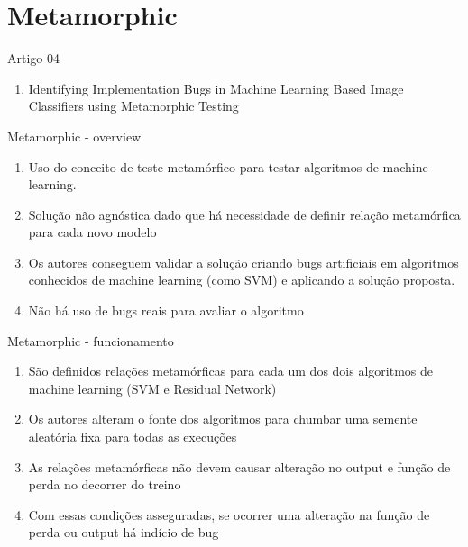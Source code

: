 \section{Metamorphic}

\begin{frame}
	\begin{block}{Artigo 04}
	\begin{enumerate}
		\item Identifying Implementation Bugs in Machine Learning Based Image Classifiers using Metamorphic Testing \cite{Metamorphic}
	\end{enumerate}
	\end{block}
\end{frame}

\begin{frame}
	\begin{block}{Metamorphic - overview}
	\begin{enumerate}
		\item Uso do conceito de teste metamórfico para testar algoritmos de machine learning.
		\item Solução não agnóstica dado que há necessidade de definir relação metamórfica para cada novo modelo
		\item Os autores conseguem validar a solução criando bugs artificiais em algoritmos conhecidos de machine learning (como SVM) e aplicando a solução proposta.
		\item Não há uso de bugs reais para avaliar o algoritmo
	\end{enumerate}
	\end{block}
\end{frame}

\begin{frame}
	\begin{block}{Metamorphic - funcionamento}
		\begin{enumerate}
			\item São definidos relações metamórficas para cada um dos dois algoritmos de machine learning (SVM e Residual Network)
			\item Os autores alteram o fonte dos algoritmos para chumbar uma semente aleatória fixa para todas as execuções
			\item As relações metamórficas não devem causar alteração no output e  função de perda no decorrer do treino
			\item Com essas condições asseguradas, se ocorrer uma alteração na função de perda ou output há indício de bug
		\end{enumerate}
	\end{block}
\end{frame}


